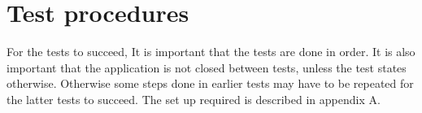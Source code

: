 \chapter{Test procedures}
\label{chap:testProcedures}
For the tests to succeed, It is important that the tests are done in order. It is also important that the application is not closed between tests, unless the test states otherwise. Otherwise some steps done in earlier tests may have to be repeated for the latter tests to succeed. The set up required is described in appendix A.